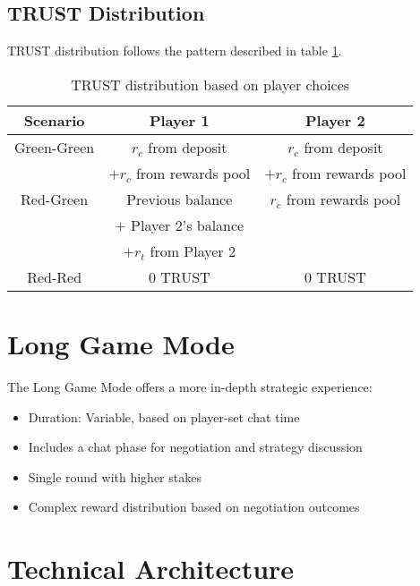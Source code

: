 \documentclass[table, twocolumn]{article}
\begin{document}
\subsection{TRUST Distribution}
TRUST distribution follows the pattern described in table \ref{tab:trust-distribution}.

\begin{table}[!htb]
  \centering
  \begin{tabular}{|c|c|c|}
    \hline \rowcolor{gray!20}
    Scenario        & Player 1                 & Player 2                 \\ \hline
    Green-Green     & $r_c$ from deposit       & $r_c$ from deposit       \\
                    & $+r_c$ from rewards pool & $+r_c$ from rewards pool \\ \hline
    Red-Green       & Previous balance         & $r_c$ from rewards pool  \\
                    & $+$ Player 2's balance   &                          \\
                    & $+r_t$ from Player 2     &                          \\ \hline
    Red-Red         & 0 TRUST                  & 0 TRUST                  \\ \hline
  \end{tabular}
  \caption{TRUST distribution based on player choices}
  \label{tab:trust-distribution}
\end{table}

\section{Long Game Mode} \label{sec:long-game-mode}

The Long Game Mode offers a more in-depth strategic experience:

\begin{itemize}
    \item Duration: Variable, based on player-set chat time
    \item Includes a chat phase for negotiation and strategy discussion
    \item Single round with higher stakes
    \item Complex reward distribution based on negotiation outcomes
\end{itemize}

\section{Technical Architecture}
\end{document}
